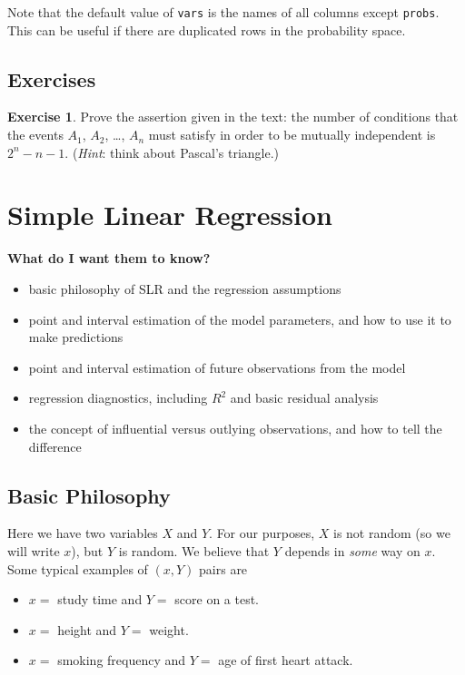 \documentclass[]{book}
\providecommand{\tightlist}{%
  \setlength{\itemsep}{0pt}\setlength{\parskip}{0pt}}
\numberwithin{equation}{chapter}
\numberwithin{figure}{chapter}
\theoremstyle{plain}
\theoremstyle{definition}
\newtheorem{xca}{Exercise}[chapter]
\theoremstyle{remark}
\theoremstyle{definition}
\theoremstyle{definition}
\theoremstyle{remark}
\begin{document}
Note that the default value of \texttt{vars} is the names of all columns
except \texttt{probs}. This can be useful if there are duplicated rows
in the probability space.

\section{Exercises}\label{exercises-2}

\bigskip

\begin{xca}
Prove the assertion given in the text: the number of conditions that the
events \(A_{1}\), \(A_{2}\), \ldots{}, \(A_{n}\) must satisfy in order
to be mutually independent is \(2^{n} - n - 1\). (\emph{Hint}: think
about Pascal's triangle.)
\end{xca}

\chapter{Simple Linear Regression}\label{cha-simple-linear-regression}

\textbf{What do I want them to know?}

\begin{itemize}
\tightlist
\item
  basic philosophy of SLR and the regression assumptions
\item
  point and interval estimation of the model parameters, and how to use
  it to make predictions
\item
  point and interval estimation of future observations from the model
\item
  regression diagnostics, including \(R^{2}\) and basic residual
  analysis
\item
  the concept of influential versus outlying observations, and how to
  tell the difference
\end{itemize}

\section{Basic Philosophy}\label{sec-basic-philosophy}

Here we have two variables \(X\) and \(Y\). For our purposes, \(X\) is
not random (so we will write \(x\)), but \(Y\) is random. We believe
that \(Y\) depends in \emph{some} way on \(x\). Some typical examples of
\((x,Y)\) pairs are

\begin{itemize}
\tightlist
\item
  \(x =\) study time and \(Y =\) score on a test.
\item
  \(x =\) height and \(Y =\) weight.
\item
  \(x =\) smoking frequency and \(Y =\) age of first heart attack.
\end{itemize}
\end{document}
